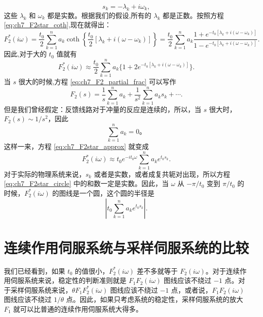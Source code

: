 \begin{equation}
s_k = -\lambda_k + i\omega_k,
\end{equation}
这些 $\lambda_k$ 和 $\omega_k$ 都是实数。根据我们的假设,所有的 $\lambda_k$ 都是正数。按照方程 \eqref{eq:ch7_F2star_coth},现在就得出：
\begin{equation*}
F_2^*(i\omega) = \frac{t_0}{2} \sum_{k=1}^{n} a_k \coth \left\{ \frac{t_0}{2} [\lambda_k + i(\omega - \omega_k)] \right\}
= \frac{t_0}{2} \sum_{k=1}^{n} a_k \frac{1 + e^{-t_0[\lambda_k + i(\omega - \omega_k)]}}{1 - e^{-t_0[\lambda_k + i(\omega - \omega_k)]}}.
\end{equation*}
因此,对于大的 $t_0$ 值就有
\begin{equation}\label{eq:ch7_F2star_approx}
F_2^*(i\omega) \approx \frac{t_0}{2} \sum_{k=1}^{n} a_k \{1 + 2e^{-t_0[\lambda_k + i(\omega - \omega_k)]}\}.
\end{equation}
当 $s$ 很大的时候,方程 \eqref{eq:ch7_F2_partial_frac} 可以写作
\begin{equation*}
F_2(s) = \frac{1}{s} \sum_{k=1}^{n} a_k + \frac{1}{s^2} \sum_{k=1}^{n} a_k s_k + \cdots.
\end{equation*}
但是我们曾经假定：反馈线路对于冲量的反应是连续的，所以，当 $s$ 很大时，$F_2(s) \sim 1/s^2$，因此
\begin{equation}\label{eq:ch7_a_k}
\sum_{k=1}^n a_k = 0。
\end{equation}
这样一来，方程 \eqref{eq:ch7_F2star_approx} 就变成
\begin{equation}\label{eq:ch7_F2star_circle}
F_2^*(i\omega) \approx t_0 e^{-it_0 \omega} \sum_{k=1}^n a_k e^{t_0 s_k}.
\end{equation}
对于实际的物理系统来说，$s_k$ 或者是实数，或者成复共轭对出现，所以方程 \eqref{eq:ch7_F2star_circle} 中的和数一定是实数。因此，当 $\omega$ 从 $-\pi/t_0$ 变到 $\pi/t_0$ 的时候，$F_2^*(i\omega)$ 的图线是一个圆，这个圆的半径是
\begin{equation}\label{eq:ch7_radius_of_circle}
\left| t_0 \sum_{k=1}^n a_k e^{t_0 s_k} \right|.
\end{equation}

\section{连续作用伺服系统与采样伺服系统的比较}

我们已经看到，如果 $t_0$ 的值很小，$F_2^* (i\omega)$ 差不多就等于 $F_2 (i\omega)$。对于连续作用伺服系统来说，稳定性的判断准则就是 $F_1 F_2 (i\omega)$ 图线应该不绕过 $-1$ 点。对于采样伺服系统来说，$\theta F_1 F_2^* (i\omega)$ 图线应该不绕过 $-1$ 点，或者说，$F_1 F_2 (i\omega)$ 图线应该不绕过 $1/\theta$ 点。因此，如果只考虑系统的稳定性，采样伺服系统的放大 $F_1$ 就可以比普通的连续作用伺服系统大得多。

